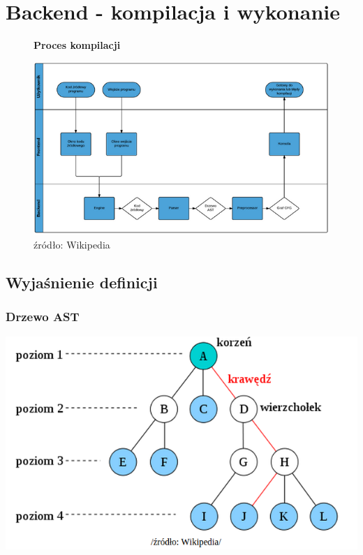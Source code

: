 \documentclass[a4paper,twoside,openright,11pt]{report}
\begin{document}
  \chapter {Backend - kompilacja i wykonanie}
  
\begin{figure}[H]
  \centering
  \textbf{Proces kompilacji}\par\medskip
  \includegraphics[width=\textwidth]{flow}
  \caption{źródło: Wikipedia}
\end{figure}

  
  \section {Wyjaśnienie definicji}

  \subsection {Drzewo AST}
\begin{center}
  \includegraphics[width=\textwidth]{ast}
\end{center}
  
\end{document}
